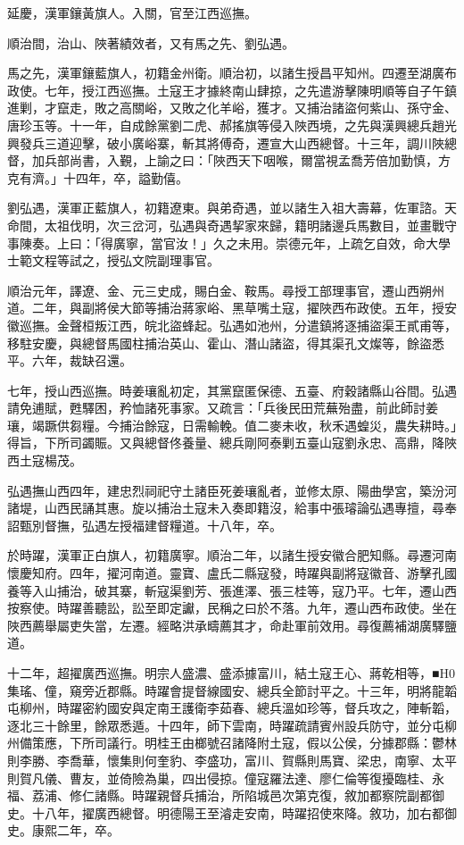 \begin{pinyinscope}
延慶，漢軍鑲黃旗人。入關，官至江西巡撫。

順治間，治山、陜著績效者，又有馬之先、劉弘遇。

馬之先，漢軍鑲藍旗人，初籍金州衛。順治初，以諸生授昌平知州。四遷至湖廣布政使。七年，授江西巡撫。土寇王才據終南山肆掠，之先遣游擊陳明順等自子午鎮進剿，才竄走，敗之高關峪，又敗之化羊峪，獲才。又捕治諸盜何紫山、孫守金、唐珍玉等。十一年，自成餘黨劉二虎、郝搖旗等侵入陜西境，之先與漢興總兵趙光興發兵三道迎擊，破小廣峪寨，斬其將傅奇，遷宣大山西總督。十三年，調川陜總督，加兵部尚書，入覲，上諭之曰：「陜西天下咽喉，爾當視孟喬芳倍加勤慎，方克有濟。」十四年，卒，謚勤僖。

劉弘遇，漢軍正藍旗人，初籍遼東。與弟奇遇，並以諸生入祖大壽幕，佐軍諮。天命間，太祖伐明，次三岔河，弘遇與奇遇挈家來歸，籍明諸邊兵馬數目，並畫戰守事陳奏。上曰：「得廣寧，當官汝！」久之未用。崇德元年，上疏乞自效，命大學士範文程等試之，授弘文院副理事官。

順治元年，譯遼、金、元三史成，賜白金、鞍馬。尋授工部理事官，遷山西朔州道。二年，與副將侯大節等捕治蔣家峪、黑草嘴土寇，擢陜西布政使。五年，授安徽巡撫。金聲桓叛江西，皖北盜蜂起。弘遇如池州，分遣鎮將逐捕盜渠王貳甫等，移駐安慶，與總督馬國柱捕治英山、霍山、潛山諸盜，得其渠孔文燦等，餘盜悉平。六年，裁缺召還。

七年，授山西巡撫。時姜瓖亂初定，其黨竄匿保德、五臺、府穀諸縣山谷間。弘遇請免逋賦，甦驛困，矜恤諸死事家。又疏言：「兵後民田荒蕪殆盡，前此師討姜瓖，竭蹶供芻糧。今捕治餘寇，日需輸輓。值二麥未收，秋禾遇蝗災，農失耕時。」得旨，下所司蠲賑。又與總督佟養量、總兵剛阿泰剿五臺山寇劉永忠、高鼎，降陜西土寇楊茂。

弘遇撫山西四年，建忠烈祠祀守土諸臣死姜瓖亂者，並修太原、陽曲學宮，築汾河諸堤，山西民誦其惠。旋以捕治土寇未入奏即籍沒，給事中張璿論弘遇專擅，尋奉詔甄別督撫，弘遇左授福建督糧道。十八年，卒。

於時躍，漢軍正白旗人，初籍廣寧。順治二年，以諸生授安徽合肥知縣。尋遷河南懷慶知府。四年，擢河南道。靈寶、盧氏二縣寇發，時躍與副將寇徽音、游擊孔國養等入山捕治，破其寨，斬寇渠劉芳、張進澤、張三桂等，寇乃平。七年，遷山西按察使。時躍善聽訟，訟至即定讞，民稱之曰於不落。九年，遷山西布政使。坐在陜西薦舉屬吏失當，左遷。經略洪承疇薦其才，命赴軍前效用。尋復薦補湖廣驛鹽道。

十二年，超擢廣西巡撫。明宗人盛濃、盛添據富川，結土寇王心、蔣乾相等，■H0集瑤、僮，窺旁近郡縣。時躍會提督線國安、總兵全節討平之。十三年，明將龍韜屯柳州，時躍密約國安與定南王護衛李茹春、總兵溫如珍等，督兵攻之，陣斬韜，逐北三十餘里，餘眾悉遁。十四年，師下雲南，時躍疏請賓州設兵防守，並分屯柳州備策應，下所司議行。明桂王由榔號召諸降附土寇，假以公侯，分據郡縣：鬱林則李勝、李喬華，懷集則何奎豹、李盛功，富川、賀縣則馬寶、梁忠，南寧、太平則賀凡儀、曹友，並倚險為巢，四出侵掠。僮寇羅法達、廖仁倫等復擾臨桂、永福、荔浦、修仁諸縣。時躍親督兵捕治，所陷城邑次第克復，敘加都察院副都御史。十八年，擢廣西總督。明德陽王至濬走安南，時躍招使來降。敘功，加右都御史。康熙二年，卒。


\end{pinyinscope}
